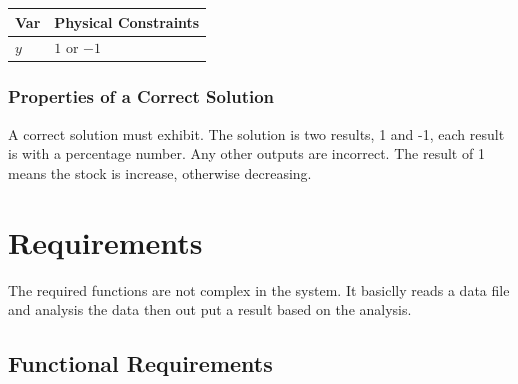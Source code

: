 \documentclass[12pt]{article}
\begin{document}
\begin{table}[!h]
\caption{Output Variables} \label{TblOutputVar}
\renewcommand{\arraystretch}{1.2}
\noindent \begin{longtable*}{l l} 
  \toprule
  \textbf{Var} & \textbf{Physical Constraints} \\
  \midrule 
  $y$ & $1$ or $-1$ 
  \\
  \bottomrule
\end{longtable*}
\end{table}

\subsubsection{Properties of a Correct Solution} \label{sec_CorrectSolution}

\noindent
A correct solution must exhibit. The solution is two results, 1 and -1, each result is with a percentage number.  Any other outputs are incorrect. The result of 1 means the stock is increase, otherwise decreasing.

\section{Requirements}

The required functions are not complex in the system. It basiclly reads a data file and analysis the data then out put a result based on the analysis. 

\subsection{Functional Requirements}
\end{document}
